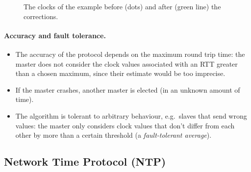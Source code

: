 \begin{figure}[H]
  \centering
  \caption{The clocks of the example before (dots) and after (green line) the corrections.}
  \label{fig:berkeley-example}
\end{figure}

\paragraph{Accuracy and fault tolerance.}
\begin{itemize}
  \item The accuracy of the protocol depends on the maximum round trip time: the master does not consider the clock values associated with an RTT greater than a chosen maximum, since their estimate would be too imprecise.
  \item If the master crashes, another master is elected (in an unknown amount of time).
  \item The algorithm is tolerant to arbitrary behaviour, e.g.\ slaves that send wrong values: the master only considers clock values that don't differ from each other by more than a certain threshold (a \textit{fault-tolerant average}).
\end{itemize}

\subsection{Network Time Protocol (NTP)}

